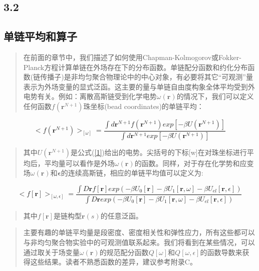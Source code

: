 \subsection{3.2}
\subsection{单链平均和算子}
\begin{quotation}
	在前面的章节中，我们描述了如何使用Chapman-Kolmogorov或Fokker-Planck方程计算单链在外场存在下的分布函数。单链配分函数和约化分布函数(链传播子)是非均匀聚合物理论中的中心对象，有必要将其它“可观测”量表示为外场变量的显式泛函。这主要的量与单链自由度构象全体平均受到外电势有关。例如：离散高斯链受到化学电势$\omega (\mathbf{r})$的情况下，我们可以定义任何函数$f(\mathbf{r}^{N+1})$珠坐标(bead coordinates)的单链平均：
\end{quotation}
\begin{equation}\label{1}
<f(\mathbf{r}^{N+1})>_{[\omega]}= \frac{\int d \mathbf{r}^{N+1} f(\mathbf{r}^{N+1})exp[-\beta U(\mathbf{r}^{N+1})]}{\int d\mathbf{r}^{N+1}exp[-\beta U(\mathbf{r}^{N+1})]}
\end{equation}
\begin{quotation}
	其中$U(\mathbf{r}^{N+1})$是公式(\ref{1})给出的电势。尖括号的下标[w]在对珠坐标进行平均后，平均量可以看作是外场$\omega(\mathbf{r})$的函数。同样，对于存在化学势和应变场$\omega(\mathbf{r})$和$\mathbf{\epsilon}$的连续高斯链，相应的单链平均值可以定义为:
\end{quotation}
\begin{equation}\label{2}
<f[\mathbf{r}]>_{[\omega ,\epsilon]}=\frac{\int D\mathbf{r}f[\mathbf{r}]exp(-\beta U_{0}[\mathbf{r}]-\beta U_{1}[\mathbf{r},\omega]-\beta U_{el}[\mathbf{r},\epsilon])}{\int D\mathbf{r}exp(-\beta U_{0}[\mathbf{r}]-\beta U_{1}[\mathbf{r},\omega]-\beta U_{el}[\mathbf{r},\epsilon])}
\end{equation}
\begin{quotation}
	其中$f[\mathbf{r}]$是链构型$\mathbf{r}(s)$的任意泛函。
\end{quotation}
\begin{quotation}
	主要有趣的单链平均量是段密度、密度相关性和弹性应力，所有这些都可以与非均匀聚合物实验中的可观测值联系起来。我们将看到在某些情况，可以通过取关于场变量$\omega(\mathbf{r})$的规范配分函数$Q[\omega]$和$Q[\omega,\epsilon]$的函数导数来获得这些结果。读者不熟悉函数的差异，建议参考附录C。
\end{quotation}

